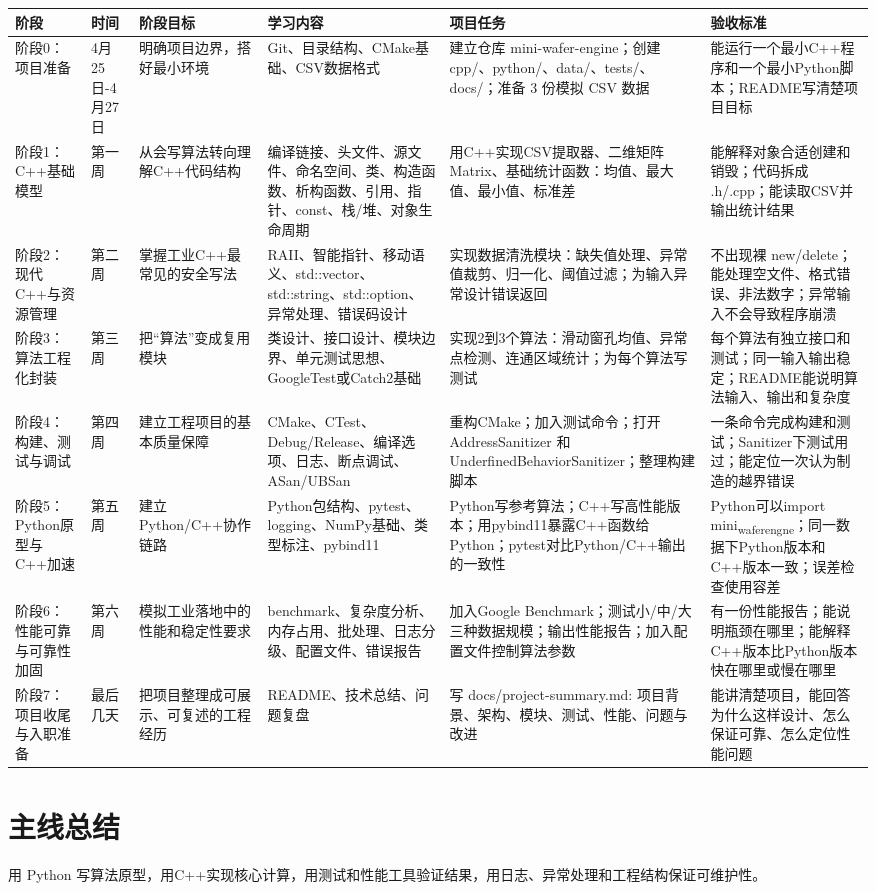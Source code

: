 \documentclass[UTF8,a4paper,12pt]{ctexart}
\begin{document}
\begin{center}
\begin{tabular}{llllll}
阶段 & 时间 & 阶段目标 & 学习内容 & 项目任务 & 验收标准\\
\hline
阶段0：项目准备 & 4月25日-4月27日 & 明确项目边界，搭好最小环境 & Git、目录结构、CMake基础、CSV数据格式 & 建立仓库 mini-wafer-engine；创建 cpp/、python/、data/、tests/、docs/；准备 3 份模拟 CSV 数据 & 能运行一个最小C++程序和一个最小Python脚本；README写清楚项目目标\\
阶段1：C++基础模型 & 第一周 & 从会写算法转向理解C++代码结构 & 编译链接、头文件、源文件、命名空间、类、构造函数、析构函数、引用、指针、const、栈/堆、对象生命周期 & 用C++实现CSV提取器、二维矩阵 Matrix、基础统计函数：均值、最大值、最小值、标准差 & 能解释对象合适创建和销毁；代码拆成 .h/.cpp；能读取CSV并输出统计结果\\
阶段2：现代C++与资源管理 & 第二周 & 掌握工业C++最常见的安全写法 & RAII、智能指针、移动语义、std::vector、std::string、std::option、异常处理、错误码设计 & 实现数据清洗模块：缺失值处理、异常值裁剪、归一化、阈值过滤；为输入异常设计错误返回 & 不出现裸 new/delete；能处理空文件、格式错误、非法数字；异常输入不会导致程序崩溃\\
阶段3：算法工程化封装 & 第三周 & 把“算法”变成复用模块 & 类设计、接口设计、模块边界、单元测试思想、GoogleTest或Catch2基础 & 实现2到3个算法：滑动窗孔均值、异常点检测、连通区域统计；为每个算法写测试 & 每个算法有独立接口和测试；同一输入输出稳定；README能说明算法输入、输出和复杂度\\
阶段4：构建、测试与调试 & 第四周 & 建立工程项目的基本质量保障 & CMake、CTest、Debug/Release、编译选项、日志、断点调试、ASan/UBSan & 重构CMake；加入测试命令；打开 AddressSanitizer 和 UnderfinedBehaviorSanitizer；整理构建脚本 & 一条命令完成构建和测试；Sanitizer下测试用过；能定位一次认为制造的越界错误\\
阶段5：Python原型与C++加速 & 第五周 & 建立Python/C++协作链路 & Python包结构、pytest、logging、NumPy基础、类型标注、pybind11 & Python写参考算法；C++写高性能版本；用pybind11暴露C++函数给Python；pytest对比Python/C++输出的一致性 & Python可以import mini\textsubscript{wafer}\textsubscript{engne}；同一数据下Python版本和C++版本一致；误差检查使用容差\\
阶段6：性能可靠与可靠性加固 & 第六周 & 模拟工业落地中的性能和稳定性要求 & benchmark、复杂度分析、内存占用、批处理、日志分级、配置文件、错误报告 & 加入Google Benchmark；测试小/中/大三种数据规模；输出性能报告；加入配置文件控制算法参数 & 有一份性能报告；能说明瓶颈在哪里；能解释C++版本比Python版本快在哪里或慢在哪里\\
阶段7：项目收尾与入职准备 & 最后几天 & 把项目整理成可展示、可复述的工程经历 & README、技术总结、问题复盘 & 写 docs/project-summary.md: 项目背景、架构、模块、测试、性能、问题与改进 & 能讲清楚项目，能回答为什么这样设计、怎么保证可靠、怎么定位性能问题\\
\end{tabular}
\end{center}
\section{主线总结}
\label{sec:org35b58bb}
用 Python 写算法原型，用C++实现核心计算，用测试和性能工具验证结果，用日志、异常处理和工程结构保证可维护性。
\end{document}
